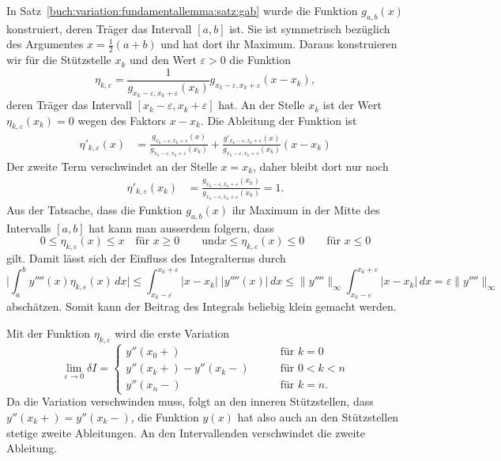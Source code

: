 In Satz~\ref{buch:variation:fundamentallemma:satz:gab} wurde die
Funktion $g_{a,b}(x)$ konstruiert, deren Träger das Intervall
$[a,b]$ ist.
Sie ist symmetrisch bezüglich des Argumentes $x=\frac12(a+b)$
und hat dort ihr Maximum.
Daraus konstruieren wir für die Stützstelle $x_k$ und den Wert
$\varepsilon>0$ die Funktion
\[
\eta_{k,\varepsilon}
=
\frac{1}{g_{x_k-\varepsilon,x_k+\varepsilon}(x_k)}
g_{x_k-\varepsilon,x_k+\varepsilon}
(x-x_k),
\]
deren Träger das Intervall $[x_k-\varepsilon,x_k+\varepsilon]$ hat.
An der Stelle $x_k$ ist der Wert $\eta_{k,\varepsilon}(x_k)=0$
wegen des Faktors $x-x_k$.
Die Ableitung der Funktion ist
\begin{align*}
\eta'_{k,\varepsilon}(x)
&=
\frac{g_{x_k-\varepsilon,x_k+\varepsilon}(x)}{g_{x_k-\varepsilon,x_k+\varepsilon}(x_k)}
+
\frac{g'_{x_k-\varepsilon,x_k+\varepsilon}(x)}{g_{x_k-\varepsilon,x_k+\varepsilon}(x_k)}
(x-x_k)
\end{align*}
Der zweite Term verschwindet an der Stelle $x=x_k$, daher bleibt dort nur noch
\begin{align*}
\eta'_{k,\varepsilon}(x_k)
&=
\frac{
g_{x_k-\varepsilon,x_k+\varepsilon}(x_k)
}{
g_{x_k-\varepsilon,x_k+\varepsilon}(x_k)
}
=
1.
\end{align*}
Aus der Tatsache, dass die Funktion $g_{a,b}(x)$ ihr Maximum in der
Mitte des Intervalls $[a,b]$ hat kann man ausserdem folgern, dass 
\[
0
\le
\eta_{k,\varepsilon}(x)
\le
x
\quad\text{für $x\ge 0$}
\qquad\text{und}
x\le \eta_{k,\varepsilon}(x)\le 0
\quad
\quad
\text{für $x\le 0$}
\]
gilt.
Damit lässt sich der Einfluss des Integralterms durch
\[
\biggl|
\int_{a}^{b}
y''''(x)\eta_{k,\varepsilon}(x)
\,dx
\biggr|
\le
\int_{x_k-\varepsilon}^{x_k+\varepsilon}
|x-x_k|
\;
|y''''(x)|\,dx
\le
\|y''''\|_{\infty}
\int_{x_k-\varepsilon}^{x_k+\varepsilon}
|x-x_k|\,dx
=
\varepsilon \| y''''\|_{\infty}
\]
abschätzen.
Somit kann der Beitrag des Integrals beliebig klein gemacht werden.

Mit der Funktion $\eta_{k,\varepsilon}$ wird die erste
Variation
\[
\lim_{\varepsilon\to 0}
\delta I
=
\begin{cases}
y''(x_0+)
&\qquad \text{für $k=0$}
\\
y''(x_k+)-y''(x_k-)
&\qquad \text{für $0<k<n$}
\\
y''(x_n-)
&\qquad \text{für $k=n$.}
\end{cases}
\]
Da die Variation verschwinden muss, folgt an den inneren Stützstellen,
dass $y''(x_k+)=y''(x_k-)$, die Funktion $y(x)$ hat also auch an
den Stützstellen stetige zweite Ableitungen.
An den Intervallenden verschwindet die zweite Ableitung.

